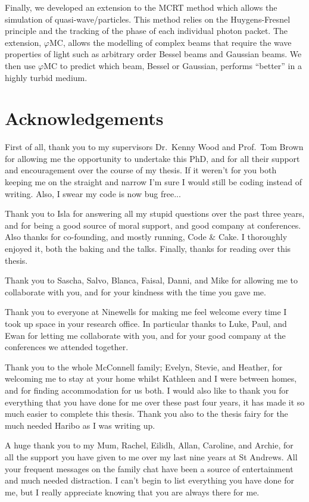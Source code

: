 \documentclass[10pt,a4paper,twoside]{book}
\begin{document}
Finally, we developed an extension to the MCRT method which allows the simulation of quasi-wave/particles.
This method relies on the Huygens-Fresnel principle and the tracking of the phase of each individual photon packet.
The extension, $\varphi$MC, allows the modelling of complex beams that require the wave properties of light such as arbitrary order Bessel beams and Gaussian beams.
We then use $\varphi$MC to predict which beam, Bessel or Gaussian, performs ``better'' in a highly turbid medium.


\chapter{Acknowledgements}
First of all, thank you to my supervisors Dr.~Kenny Wood and Prof.~Tom Brown for allowing me the opportunity to undertake this PhD, and for all their support and encouragement over the course of my thesis.
If it weren't for you both keeping me on the straight and narrow I'm sure I would still be coding instead of writing.
Also, I swear my code is now bug free...
\medskip


Thank you to Isla for answering all my stupid questions over the past three years, and for being a good source of moral support, and good company at conferences.
Also thanks for co-founding, and mostly running, Code \& Cake. I thoroughly enjoyed it, both the baking and the talks.
Finally, thanks for reading over this thesis.
\medskip

Thank you to Sascha, Salvo, Blanca, Faisal, Danni, and Mike for allowing me to collaborate with you, and for your kindness with the time you gave me.
\medskip

Thank you to everyone at Ninewells for making me feel welcome every time I took up space in your research office.
In particular thanks to Luke, Paul, and Ewan for letting me collaborate with you, and for your good company at the conferences we attended together.
\medskip

Thank you to the whole McConnell family; Evelyn, Stevie, and Heather, for welcoming me to stay at your home whilst Kathleen and I were between homes, and for finding accommodation for us both.
I would also like to thank you for everything that you have done for me over these past four years, it has made it so much easier to complete this thesis.
Thank you also to the thesis fairy for the much needed Haribo as I was writing up.
\medskip

A huge thank you to my Mum, Rachel, Eilidh, Allan, Caroline, and Archie, for all the support you have given to me over my last nine years at St Andrews.
All your frequent messages on the family chat have been a source of entertainment and much needed distraction.
I can't begin to list everything you have done for me, but I really appreciate knowing that you are always there for me.
\medskip
\end{document}
